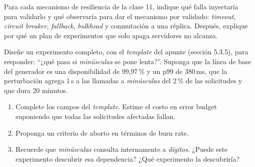 \documentclass[variant=guia,cover=institutional,mode=screen]{ua-engineering-v6-article}
\begin{document}
\begin{uaexercise}
Para cada mecanismo de resiliencia de la clase 11, indique qué falla inyectaría para validarlo y qué observaría para dar el mecanismo por validado: \emph{timeout}, \emph{circuit breaker}, \emph{fallback}, \emph{bulkhead} y conmutación a una réplica. Después, explique por qué un plan de experimentos que solo apaga servidores no alcanza.
\end{uaexercise}

\begin{uaexercise}
Diseñe un experimento completo, con el \emph{template} del apunte (sección 5.3.5), para responder: ``¿qué pasa si \emph{minúsculas} se pone lenta?''. Suponga que la línea de base del generador es una disponibilidad de 99,97\,\% y un p99 de 380\,ms, que la perturbación agrega 1\,s a las llamadas a \emph{minúsculas} del 2\,\% de las solicitudes y que dura 20 minutos.
\begin{enumerate}
\item Complete los campos del \emph{template}. Estime el costo en error budget suponiendo que todas las solicitudes afectadas fallan.
\item Proponga un criterio de aborto en términos de burn rate.
\item Recuerde que \emph{minúsculas} consulta internamente a \emph{dígitos}. ¿Puede este experimento descubrir esa dependencia? ¿Qué experimento la descubriría?
\end{enumerate}
\end{uaexercise}
\end{document}

